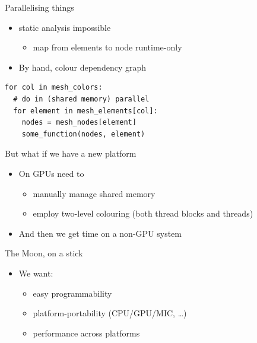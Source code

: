 \documentclass[bigger]{beamer}
\begin{document}
\begin{frame}[fragile,label={sec:orgheadline7}]{Parallelising things}
 \begin{itemize}
\item static analysis impossible
\begin{itemize}
\item map from elements to node runtime-only
\end{itemize}
\item By hand, colour dependency graph
\end{itemize}
\begin{verbatim}
for col in mesh_colors:
  # do in (shared memory) parallel
  for element in mesh_elements[col]:
    nodes = mesh_nodes[element]
    some_function(nodes, element)
\end{verbatim}
\end{frame}

\begin{frame}[label={sec:orgheadline8}]{But what if we have a new platform}
\begin{itemize}
\item On GPUs need to
\begin{itemize}
\item manually manage shared memory
\item employ two-level colouring (both thread blocks and threads)
\end{itemize}
\item And then we get time on a non-GPU system
\end{itemize}
\end{frame}

\begin{frame}[label={sec:orgheadline9}]{The Moon, on a stick}
\begin{itemize}
\item We want:
\begin{itemize}
\item easy programmability
\item platform-portability (CPU/GPU/MIC, \ldots{})
\item performance across platforms
\end{itemize}
\end{itemize}
\end{frame}
\end{document}
